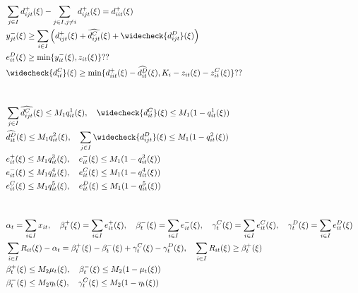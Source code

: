 \documentclass[10pt]{article}
\begin{document}
\begin{align*}
    &\sum_{j \in I}d^+_{ijt}(\xi) - \sum_{j \in I, j \neq i} d^+_{ijt}(\xi) = d^+_{iit}(\xi) &\\
    &y^-_{jt}(\xi) \geq \sum_{i \in I} \left(d^+_{ijt}(\xi) + \widehat{d^{C}_{ijt}}(\xi) + \widecheck{d^{D}_{ijt}}(\xi) \right) &\\
    &e^D_{it}(\xi) \geq \text{min} \{y^-_{it}(\xi), z_{it}(\xi) \} ??&\\
    &\widecheck{d^C_{it}}(\xi) \geq \text{min} \{d^+_{iit}(\xi) - \widehat{d^{D}_{it}}(\xi), K_i - z_{it}(\xi) - z^C_{it}(\xi) \} ??&\\
    &&\\ 
    &&\\
    &\sum_{j \in I}\widehat{d^{C}_{ijt}}(\xi) \leq M_1 q^1_{it}(\xi), \quad \widecheck{d^{C}_{it}}(\xi) \leq M_1 (1 - q^1_{it}(\xi)) &\\
    &\widehat{d^{D}_{it}}(\xi) \leq M_1 q^2_{it}(\xi), \quad \sum_{j \in I}\widecheck{d^{D}_{ijt}}(\xi) \leq M_1 (1 - q^2_{it}(\xi)) &\\
    &e^{+}_{it}(\xi) \leq M_1 q^3_{it}(\xi), \quad e^{-}_{it}(\xi) \leq M_1 (1 - q^3_{it}(\xi)) &\\
    &e^{-}_{it}(\xi) \leq M_1 q^4_{it}(\xi), \quad e^{C}_{it}(\xi) \leq M_1 (1 - q^4_{it}(\xi)) &\\
    &e^{C}_{it}(\xi) \leq M_1 q^5_{it}(\xi), \quad e^{D}_{it}(\xi) \leq M_1 (1 - q^5_{it}(\xi)) &\\
    &&\\ 
    &&\\
    &\alpha_t = \sum_{i\in I}x_{it}, \quad \beta_t^+(\xi) = \sum_{i\in I}e^+_{it}(\xi), \quad \beta_t^-(\xi) = \sum_{i\in I}e^-_{it}(\xi), \quad \gamma^C_t(\xi) = \sum_{i\in I}e^C_{it}(\xi), \quad \gamma^D_t(\xi) = \sum_{i\in I}e^D_{it}(\xi)&\\
    &\sum_{i \in I} R_{it}(\xi) - \alpha_t = \beta^+_t(\xi) - \beta^-_t(\xi) + \gamma^C_{t}(\xi) - \gamma^D_{t}(\xi), \quad \sum_{i\in I}R_{it}(\xi) \geq \beta_{t}^{+}(\xi)&\\ 
    &\beta^+_t(\xi) \le M_2 \mu_t(\xi), \quad \beta^-_t(\xi) \le M_2 (1 - \mu_t(\xi)) &\\
    &\beta^-_t(\xi) \le M_2 \eta_t(\xi), \quad \gamma^C_t(\xi) \le M_2 (1 - \eta_t(\xi)) &
\end{align*}
\end{document}
